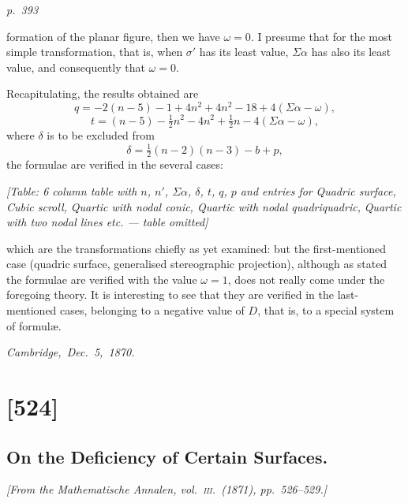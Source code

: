 \documentclass[11pt,a4paper]{book}
\begin{document}
\clearpage

\bigskip
\textit{p.~393}
\smallskip

\noindent
formation of the planar figure, then we have $\omega = 0$. I presume that for the most
simple transformation, that is, when $\sigma'$ has its least value, $\Sigma\alpha$ has also its least value,
and consequently that $\omega = 0$.

Recapitulating, the results obtained are
\[
q = -2(n - 5) - 1 + 4n^2 + 4n^2 - 18 + 4(\Sigma\alpha - \omega),
\]
\[
t = (n - 5) - \tfrac{1}{2}n^2 - 4n^2 + \tfrac{1}{2}n - 4(\Sigma\alpha - \omega),
\]
where $\delta$ is to be excluded from
\[
\delta = \tfrac{1}{2}(n - 2)(n - 3) - b + p,
\]
the formulae are verified in the several cases:

\begin{center}
\textit{[Table: 6 column table with $n$, $n'$, $\Sigma\alpha$, $\delta$, $t$, $q$, $p$ and entries for}
\textit{Quadric surface, Cubic scroll, Quartic with nodal conic, Quartic with nodal quadriquadric,}
\textit{Quartic with two nodal lines etc. --- table omitted]}
\end{center}

which are the transformations chiefly as yet examined: but the first-mentioned case
(quadric surface, generalised stereographic projection), although as stated the formulae
are verified with the value $\omega = 1$, does not really come under the foregoing theory.
It is interesting to see that they are verified in the last-mentioned cases, belonging to a
negative value of $D$, that is, to a special system of formul\ae.

\noindent\textit{Cambridge,\ Dec.\ 5,\ 1870.}

\clearpage

\section{[524]}
\subsection{On the Deficiency of Certain Surfaces.}

\begin{center}
\textit{[From the Mathematische Annalen, vol.~\textsc{iii}.\ (1871), pp.~526--529.]}
\end{center}
\end{document}
